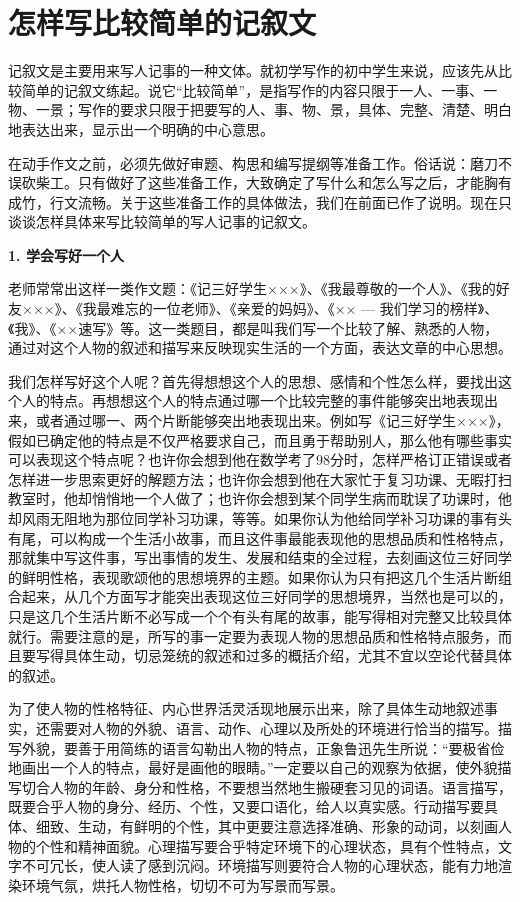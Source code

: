 \section{怎样写比较简单的记叙文}

记叙文是主要用来写人记事的一种文体。就初学写作的初中学生来说，应该先从比较简单的记叙文练起。说它“比较简单”，是指写作的内容只限于一人、一事、一物、一景；写作的要求只限于把要写的人、事、物、景，具体、完整、清楚、明白地表达出来，显示出一个明确的中心意思。

在动手作文之前，必须先做好审题、构思和编写提纲等准备工作。俗话说：磨刀不误砍柴工。只有做好了这些准备工作，大致确定了写什么和怎么写之后，才能胸有成竹，行文流畅。关于这些准备工作的具体做法，我们在前面已作了说明。现在只谈谈怎样具体来写比较简单的写人记事的记叙文。

\textbf{1. 学会写好一个人}

老师常常出这样一类作文题：《记三好学生×××》、《我最尊敬的一个人》、《我的好友×××》、《我最难忘的一位老师》、《亲爱的妈妈》、《×× --- 我们学习的榜样》、《我》、《××速写》等。这一类题目，都是叫我们写一个比较了解、熟悉的人物，通过对这个人物的叙述和描写来反映现实生活的一个方面，表达文章的中心思想。

我们怎样写好这个人呢？首先得想想这个人的思想、感情和个性怎么样，要找出这个人的特点。再想想这个人的特点通过哪一个比较完整的事件能够突出地表现出来，或者通过哪一、两个片断能够突出地表现出来。例如写《记三好学生×××》，假如已确定他的特点是不仅严格要求自己，而且勇于帮助别人，那么他有哪些事实可以表现这个特点呢？也许你会想到他在数学考了98分时，怎样严格订正错误或者怎样进一步思索更好的解题方法；也许你会想到他在大家忙于复习功课、无暇打扫教室时，他却悄悄地一个人做了；也许你会想到某个同学生病而耽误了功课时，他却风雨无阻地为那位同学补习功课，等等。如果你认为他给同学补习功课的事有头有尾，可以构成一个生活小故事，而且这件事最能表现他的思想品质和性格特点，那就集中写这件事，写出事情的发生、发展和结束的全过程，去刻画这位三好同学的鲜明性格，表现歌颂他的思想境界的主题。如果你认为只有把这几个生活片断组合起来，从几个方面写才能突出表现这位三好同学的思想境界，当然也是可以的，只是这几个生活片断不必写成一个个有头有尾的故事，能写得相对完整又比较具体就行。需要注意的是，所写的事一定要为表现人物的思想品质和性格特点服务，而且要写得具体生动，切忌笼统的叙述和过多的概括介绍，尤其不宜以空论代替具体的叙述。

为了使人物的性格特征、内心世界活灵活现地展示出来，除了具体生动地叙述事实，还需要对人物的外貌、语言、动作、心理以及所处的环境进行恰当的描写。描写外貌，要善于用简练的语言勾勒出人物的特点，正象鲁迅先生所说：“要极省俭地画出一个人的特点，最好是画他的眼睛。”一定要以自己的观察为依据，使外貌描写切合人物的年龄、身分和性格，不要想当然地生搬硬套习见的词语。语言描写，既要合乎人物的身分、经历、个性，又要口语化，给人以真实感。行动描写要具体、细致、生动，有鲜明的个性，其中更要注意选择准确、形象的动词，以刻画人物的个性和精神面貌。心理描写要合乎特定环境下的心理状态，具有个性特点，文字不可冗长，使人读了感到沉闷。环境描写则要符合人物的心理状态，能有力地渲染环境气氛，烘托人物性格，切切不可为写景而写景。


